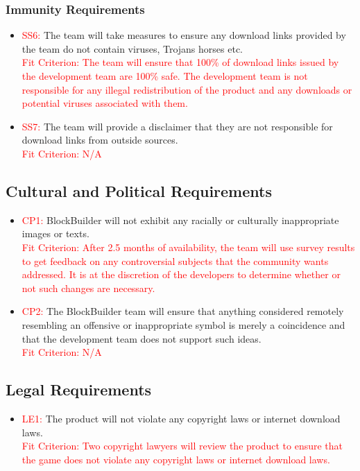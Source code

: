 \documentclass[12pt, titlepage]{article}
\begin{document}
\subsubsection{Immunity Requirements}
\begin{itemize}
    \item \textcolor{red}{SS6: }The team will take measures to ensure any download links provided by the team do not contain viruses, Trojans horses etc.\\
    \textcolor{red}{Fit Criterion: The team will ensure that 100\% of download links issued by the development team are 100\% safe. The development team is not responsible for any illegal redistribution of the product and any downloads or potential viruses associated with them.}
    \item \textcolor{red}{SS7: }The team will provide a disclaimer that they are not responsible for download links from outside sources.\\
    \textcolor{red}{Fit Criterion: N/A}
\end{itemize}

\subsection{Cultural and Political Requirements}
\begin{itemize}
    \item \textcolor{red}{CP1: }BlockBuilder will not exhibit any racially or culturally inappropriate images or texts.\\
    \textcolor{red}{Fit Criterion: After 2.5 months of availability, the team will use survey results to get feedback on any controversial subjects that the community wants addressed. It is at the discretion of the developers to determine whether or not such changes are necessary.}
    \item \textcolor{red}{CP2: }The BlockBuilder team will ensure that anything considered remotely resembling an offensive or inappropriate symbol is merely a coincidence and that the development team does not support such ideas.\\
    \textcolor{red}{Fit Criterion: N/A}
\end{itemize}
\subsection{Legal Requirements}
\begin{itemize}
    \item \textcolor{red}{LE1: }The product will not violate any copyright laws or internet download laws.\\
    \textcolor{red}{Fit Criterion: Two copyright lawyers will review the product to ensure that the game does not violate any copyright laws or internet download laws.}
\end{itemize}
\end{document}
